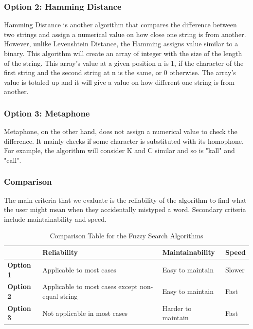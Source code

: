 \documentclass[journal,compsoc, 10pt, draftclsnofoot, onecolumn]{IEEEtran}
\begin{document}
\subsubsection*{Option 2: Hamming Distance}
Hamming Distance is another algorithm that compares the difference between two
strings and assign a numerical value on how close one string is from another.
However, unlike Levenshtein Distance, the Hamming assigns value similar to a binary.
This algorithm will create an array of integer with the size of the length of the
string. This array's value at a given position n is 1, if the character of the first
string and the second string at n is the same, or 0 otherwise. The array's value is
totaled up and it will give a value on how different one string is from another.

\subsubsection*{Option 3: Metaphone}
Metaphone, on the other hand, does not assign a numerical value to check the
difference. It mainly checks if some character is substituted with its homophone. For
example, the algorithm will consider K and C similar and so is "kall" and "call".

\subsubsection*{Comparison}
The main criteria that we evaluate is the reliability of the algorithm to find what
the user might mean when they accidentally mistyped a word. Secondary criteria
include maintainability and speed.

\begin{table}[h]
	\centering
	\caption{Comparison Table for the Fuzzy Search Algorithms}
	\label{Comparison Table for the Fuzzy Search Algorithms}
	\begin{tabularx}{\textwidth}{|l|l|l|X|}
		\hline
\textbf{} & \textbf{Reliability} & \textbf{Maintainability} & \textbf{Speed}
		\\ \hline
		\textbf{Option 1} & Applicable to most cases & Easy to maintain & Slower
		\\ \hline
\textbf{Option 2} & Applicable to most cases except non-equal string & Easy to
maintain & Fast
		\\ \hline
\textbf{Option 3} & Not applicable in most cases & Harder to maintain & Fast		\\ \hline
	\end{tabularx}
\end{table}
\end{document}
